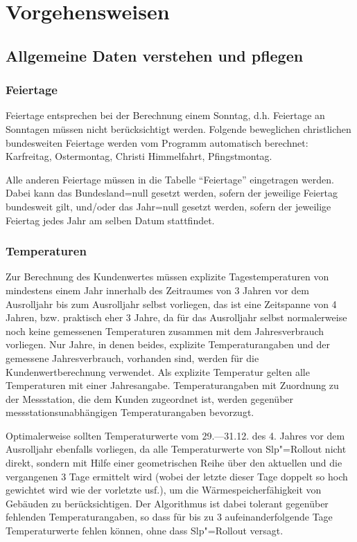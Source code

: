 \chapter{Vorgehensweisen}\label{chap:strategies}

\section{Allgemeine Daten verstehen und pflegen}

\subsection{Feiertage}\label{sec:holidays}

Feiertage entsprechen bei der Berechnung einem Sonntag, d.h. Feiertage an Sonntagen müssen nicht berücksichtigt werden.
Folgende beweglichen christlichen bundesweiten Feiertage werden vom Programm automatisch berechnet: Karfreitag, Ostermontag, Christi Himmelfahrt, Pfingstmontag.

Alle anderen Feiertage müssen in die Tabelle "`Feiertage"' eingetragen werden. Dabei kann das Bundesland=null gesetzt werden, sofern der jeweilige Feiertag bundesweit gilt, und/oder das Jahr=null gesetzt werden, sofern der jeweilige Feiertag jedes Jahr am selben Datum stattfindet.

\subsection{Temperaturen}\label{sec:temperatures}

Zur Berechnung des Kundenwertes müssen explizite Tagestemperaturen von mindestens einem Jahr innerhalb des Zeitraumes von 3 Jahren vor dem Ausrolljahr bis zum Ausrolljahr selbst vorliegen, das ist eine Zeitspanne von 4 Jahren, bzw. praktisch eher 3 Jahre, da für das Ausrolljahr selbst normalerweise noch keine gemessenen Temperaturen zusammen mit dem Jahresverbrauch vorliegen. Nur Jahre, in denen beides, explizite Temperaturangaben und der gemessene Jahresverbrauch, vorhanden sind, werden für die Kundenwertberechnung verwendet. Als explizite Temperatur gelten alle Temperaturen mit einer Jahresangabe. Temperaturangaben mit Zuordnung zu der Messstation, die dem Kunden zugeordnet ist, werden gegenüber messstationsunabhängigen Temperaturangaben bevorzugt.

Optimalerweise sollten Temperaturwerte vom 29.---31.12. des 4. Jahres vor dem Ausrolljahr ebenfalls vorliegen, da alle Temperaturwerte von Slp"=Rollout nicht direkt, sondern mit Hilfe einer geometrischen Reihe über den aktuellen und die vergangenen 3 Tage ermittelt wird (wobei der letzte dieser Tage doppelt so hoch gewichtet wird wie der vorletzte usf.), um die Wärmespeicherfähigkeit von Gebäuden zu berücksichtigen. Der Algorithmus ist dabei tolerant gegenüber fehlenden Temperaturangaben, so dass für bis zu 3 aufeinanderfolgende Tage Temperaturwerte fehlen können, ohne dass Slp"=Rollout versagt.


